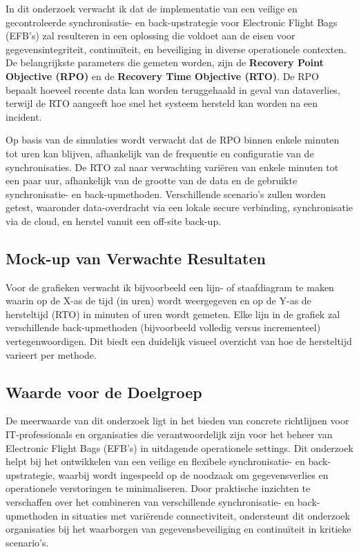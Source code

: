 In dit onderzoek verwacht ik dat de implementatie van een veilige en gecontroleerde synchronisatie- en back-upstrategie voor Electronic Flight Bags (EFB's) zal resulteren in een oplossing die voldoet aan de eisen voor gegevensintegriteit, continuïteit, en beveiliging in diverse operationele contexten. De belangrijkste parameters die gemeten worden, zijn de \textbf{Recovery Point Objective (RPO)} en de \textbf{Recovery Time Objective (RTO)}. De RPO bepaalt hoeveel recente data kan worden teruggehaald in geval van dataverlies, terwijl de RTO aangeeft hoe snel het systeem hersteld kan worden na een incident.

Op basis van de simulaties wordt verwacht dat de RPO binnen enkele minuten tot uren kan blijven, afhankelijk van de frequentie en configuratie van de synchronisaties. De RTO zal naar verwachting variëren van enkele minuten tot een paar uur, afhankelijk van de grootte van de data en de gebruikte synchronisatie- en back-upmethoden. Verschillende scenario's zullen worden getest, waaronder data-overdracht via een lokale secure verbinding, synchronisatie via de cloud, en herstel vanuit een off-site back-up.

\subsection{Mock-up van Verwachte Resultaten}
Voor de grafieken verwacht ik bijvoorbeeld een lijn- of staafdiagram te maken waarin op de X-as de tijd (in uren) wordt weergegeven en op de Y-as de hersteltijd (RTO) in minuten of uren wordt gemeten. Elke lijn in de grafiek zal verschillende back-upmethoden (bijvoorbeeld volledig versus incrementeel) vertegenwoordigen. Dit biedt een duidelijk visueel overzicht van hoe de hersteltijd varieert per methode.

\subsection{Waarde voor de Doelgroep} De meerwaarde van dit onderzoek ligt in het bieden van concrete richtlijnen voor IT-professionals en organisaties die verantwoordelijk zijn voor het beheer van Electronic Flight Bags (EFB's) in uitdagende operationele settings. Dit onderzoek helpt bij het ontwikkelen van een veilige en flexibele synchronisatie- en back-upstrategie, waarbij wordt ingespeeld op de noodzaak om gegevensverlies en operationele verstoringen te minimaliseren. Door praktische inzichten te verschaffen over het combineren van verschillende synchronisatie- en back-upmethoden in situaties met variërende connectiviteit, ondersteunt dit onderzoek organisaties bij het waarborgen van gegevensbeveiliging en continuïteit in kritieke scenario's.

